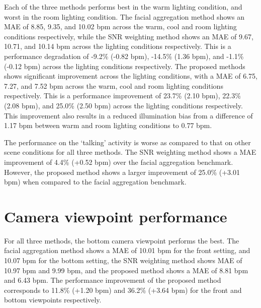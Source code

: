 Each of the three methods performs best in the warm lighting condition, and worst in the room lighting condition. The facial aggregation method shows an MAE of 8.85, 9.35, and 10.02 bpm across the warm, cool and room lighting conditions respectively, while the SNR weighting method shows an MAE of 9.67, 10.71, and 10.14 bpm across the lighting conditions respectively. This is a performance degradation of -9.2\% (-0.82 bpm), -14.5\% (1.36 bpm), and -1.1\% (-0.12 bpm) across the lighting conditions respectively. The proposed methods shows significant improvement across the lighting conditions, with a MAE of 6.75, 7.27, and 7.52 bpm across the warm, cool and room lighting conditions respectively. This is a performance improvement of 23.7\% (2.10 bpm), 22.3\% (2.08 bpm), and 25.0\% (2.50 bpm) across the lighting conditions respectively. This improvement also results in a reduced illumination bias from a difference of 1.17 bpm between warm and room lighting conditions to 0.77 bpm. 

The performance on the ‘talking’ activity is worse as compared to that on other scene conditions for all three methods. The SNR weighting method shows a MAE improvement of 4.4\% (+0.52 bpm) over the facial aggregation benchmark. However, the proposed method shows a larger improvement of 25.0\% (+3.01 bpm) when compared to the facial aggregation benchmark. 

\section{Camera viewpoint performance}

For all three methods, the bottom camera viewpoint performs the best. The facial aggregation method shows a MAE of 10.01 bpm for the front setting, and 10.07 bpm for the bottom setting, the SNR weighting method shows MAE of 10.97 bpm and 9.99 bpm, and the proposed method shows a MAE of 8.81 bpm and 6.43 bpm. The performance improvement of the proposed method corresponds to 11.8\% (+1.20 bpm) and 36.2\% (+3.64 bpm) for the front and bottom viewpoints respectively.

